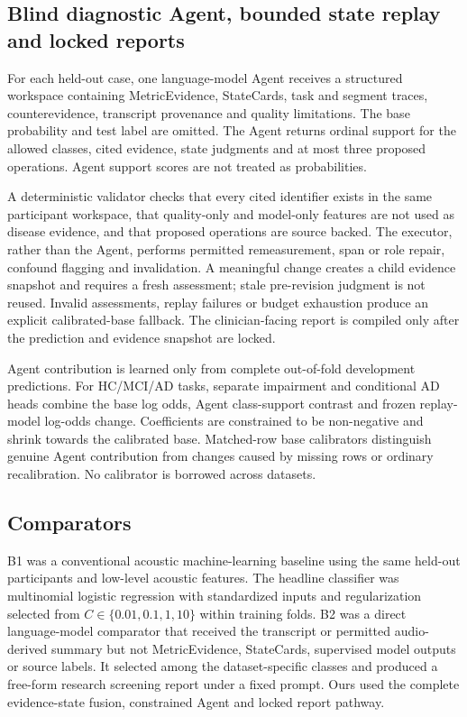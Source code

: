 \documentclass[pdflatex,sn-nature]{sn-jnl}
\begin{document}
\subsection{Blind diagnostic Agent, bounded state replay and locked reports}

For each held-out case, one language-model Agent receives a structured workspace containing MetricEvidence, StateCards, task and segment traces, counterevidence, transcript provenance and quality limitations. The base probability and test label are omitted. The Agent returns ordinal support for the allowed classes, cited evidence, state judgments and at most three proposed operations. Agent support scores are not treated as probabilities.

A deterministic validator checks that every cited identifier exists in the same participant workspace, that quality-only and model-only features are not used as disease evidence, and that proposed operations are source backed. The executor, rather than the Agent, performs permitted remeasurement, span or role repair, confound flagging and invalidation. A meaningful change creates a child evidence snapshot and requires a fresh assessment; stale pre-revision judgment is not reused. Invalid assessments, replay failures or budget exhaustion produce an explicit calibrated-base fallback. The clinician-facing report is compiled only after the prediction and evidence snapshot are locked.

Agent contribution is learned only from complete out-of-fold development predictions. For HC/MCI/AD tasks, separate impairment and conditional AD heads combine the base log odds, Agent class-support contrast and frozen replay-model log-odds change. Coefficients are constrained to be non-negative and shrink towards the calibrated base. Matched-row base calibrators distinguish genuine Agent contribution from changes caused by missing rows or ordinary recalibration. No calibrator is borrowed across datasets.

\subsection{Comparators}

B1 was a conventional acoustic machine-learning baseline using the same held-out participants and low-level acoustic features. The headline classifier was multinomial logistic regression with standardized inputs and regularization selected from $C\in\{0.01,0.1,1,10\}$ within training folds. B2 was a direct language-model comparator that received the transcript or permitted audio-derived summary but not MetricEvidence, StateCards, supervised model outputs or source labels. It selected among the dataset-specific classes and produced a free-form research screening report under a fixed prompt. Ours used the complete evidence-state fusion, constrained Agent and locked report pathway.
\end{document}
